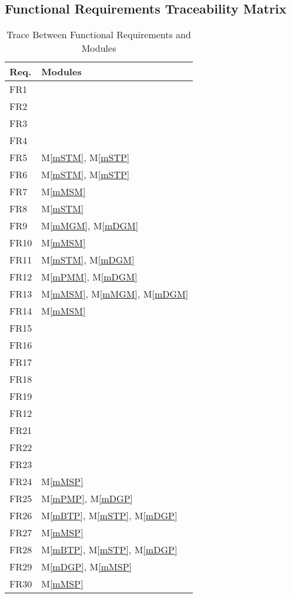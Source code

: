 \documentclass[12pt, titlepage]{article}
\newcommand{\mref}[1]{M\ref{#1}}
\begin{document}
\subsection{Functional Requirements Traceability Matrix}
\begin{table}[H]
\centering
\begin{tabular}{p{} p{}}
\toprule
\textbf{Req.} & \textbf{Modules}\\
\midrule
FR1 & \\
FR2 & \\
FR3 & \\
FR4 & \\ 
FR5 & \mref{mSTM}, \mref{mSTP}\\
FR6 & \mref{mSTM}, \mref{mSTP}\\
FR7 & \mref{mMSM}\\ 
FR8 & \mref{mSTM}\\
FR9 & \mref{mMGM}, \mref{mDGM}\\
FR10 & \mref{mMSM}\\
FR11 & \mref{mSTM}, \mref{mDGM}\\
FR12 & \mref{mPMM}, \mref{mDGM}\\
FR13 & \mref{mMSM}, \mref{mMGM}, \mref{mDGM}\\
FR14 & \mref{mMSM}\\ 
FR15 & \\
FR16 & \\
FR17 & \\ 
FR18 & \\
FR19 & \\
FR12 & \\
FR21 & \\
FR22 & \\
FR23 & \\
FR24 & \mref{mMSP}\\ 
FR25 & \mref{mPMP}, \mref{mDGP}\\
FR26 & \mref{mBTP}, \mref{mSTP}, \mref{mDGP}\\
FR27 & \mref{mMSP}\\ 
FR28 & \mref{mBTP}, \mref{mSTP}, \mref{mDGP}\\
FR29 & \mref{mDGP}, \mref{mMSP}\\
FR30 & \mref{mMSP}\\
\bottomrule
\end{tabular}
\caption{Trace Between Functional Requirements and Modules}
\label{TblFRT}
\end{table}
\end{document}
